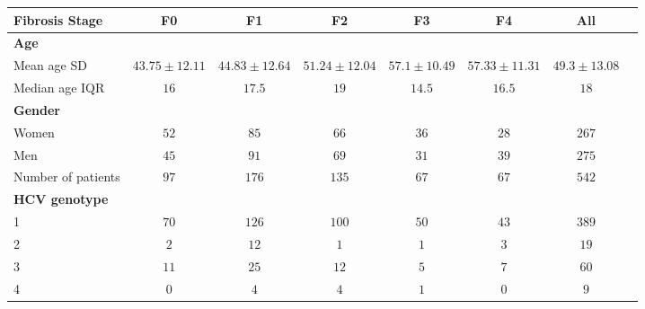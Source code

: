 \documentclass{article}
\begin{document}
\begin{enumerate}
\begin{enumerate}
\begin{table}[H]
  \centering
    \begin{tabular}{lccccccc}\hline
    Fibrosis Stage    & F0 & F1 & F2 & F3 & F4 & All\\\hline\hline
    \textbf{Age}                &&&&&&\\
    Mean age SD        &  $43.75 \pm 12.11$       
                       &  $44.83 \pm 12.64$   
                       &  $51.24 \pm 12.04$
                       &  $57.1 \pm 10.49$
                       &  $57.33 \pm 11.31$
                       &  $49.3 \pm 13.08$ \\
                                
    Median age IQR     &  $16$  &  $17.5$
                       &  $19$  &  $14.5$
                       &  $16.5$  &  $18$ \\
                               
    \textbf{Gender}             &&&&&&\\
    Women              &  $52$  &  $85$ 
                       &  $66$  &  $36$ 
                       &  $28$  &  $267$ \\
                       
    Men                &  $45$  &  $91$ 
                       &  $69$  &  $31$ 
                       &  $39$  &  $275$ \\
                       
    Number of patients &  $97$  &  $176$ 
                       &  $135$  &  $67$ 
                       &  $67$  &  $542$ \\
    \textbf{HCV genotype}       &&&&&&\\
    1                  &  $70$  & $126$ 
                       &  $100$  & $50$
                       &  $43$  & $389$\\
                       
    2                  &  $2$  & $12$ 
                       &  $1$  & $1$
                       &  $3$  & $19$\\
                       
    3                  &  $11$  & $25$ 
                       &  $12$  & $5$
                       &  $7$  & $60$\\
                       
    4                  &  $0$  & $4$ 
                       &  $4$  & $1$
                       &  $0$  & $9$\\
                       

\end{tabular}
\end{table}
\end{enumerate}
\end{enumerate}
\end{document}
